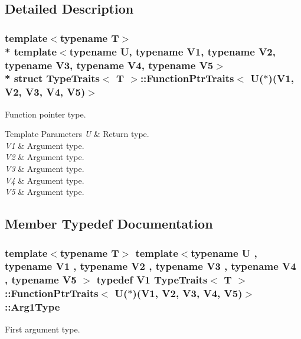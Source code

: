 \subsection{Detailed Description}
\subsubsection*{template$<$typename T$>$\\*
template$<$typename U, typename V1, typename V2, typename V3, typename V4, typename V5$>$\\*
struct Type\+Traits$<$ T $>$\+::\+Function\+Ptr\+Traits$<$ U($\ast$)(\+V1, V2, V3, V4, V5)$>$}

Function pointer type. 
\begin{DoxyTemplParams}{Template Parameters}
{\em U} & Return type. \\
\hline
{\em V1} & Argument type. \\
\hline
{\em V2} & Argument type. \\
\hline
{\em V3} & Argument type. \\
\hline
{\em V4} & Argument type. \\
\hline
{\em V5} & Argument type. \\
\hline
\end{DoxyTemplParams}


\subsection{Member Typedef Documentation}
\subsubsection[{\texorpdfstring{Arg1\+Type}{Arg1Type}}]{\setlength{\rightskip}{0pt plus 5cm}template$<$typename T$>$ template$<$typename U , typename V1 , typename V2 , typename V3 , typename V4 , typename V5 $>$ typedef V1 {\bf Type\+Traits}$<$ T $>$\+::{\bf Function\+Ptr\+Traits}$<$ U($\ast$)(V1, V2, V3, V4, V5)$>$\+::{\bf Arg1\+Type}}\hypertarget{structTypeTraits_1_1FunctionPtrTraits_3_01U_07_5_08_07V1_00_01V2_00_01V3_00_01V4_00_01V5_08_4_a8b94d48c925017504a420e57398ce5bc}{}\label{structTypeTraits_1_1FunctionPtrTraits_3_01U_07_5_08_07V1_00_01V2_00_01V3_00_01V4_00_01V5_08_4_a8b94d48c925017504a420e57398ce5bc}
First argument type. 
